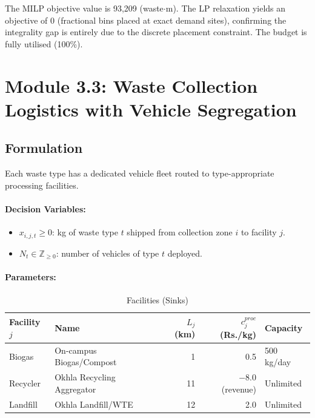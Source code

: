 \documentclass[11pt,a4paper]{article}
\begin{document}
The MILP objective value is 93,209 (waste$\cdot$m). The LP relaxation yields an objective of 0 (fractional bins placed at exact demand sites), confirming the integrality gap is entirely due to the discrete placement constraint. The budget is fully utilised (100\%).

\section{Module 3.3: Waste Collection Logistics with Vehicle Segregation}
\label{sec:mod33}

\subsection{Formulation}

Each waste type has a dedicated vehicle fleet routed to type-appropriate processing facilities.

\paragraph{Decision Variables:}
\begin{itemize}
    \item $x_{i,j,t} \ge 0$: kg of waste type $t$ shipped from collection zone $i$ to facility $j$.
    \item $N_t \in \mathbb{Z}_{\ge 0}$: number of vehicles of type $t$ deployed.
\end{itemize}

\paragraph{Parameters:}

\begin{table}[H]
\centering
\caption{Facilities (Sinks)}
\begin{tabular}{llrrl}
\toprule
\textbf{Facility $j$} & \textbf{Name} & \textbf{$L_j$ (km)} & \textbf{$c^{proc}_j$ (Rs./kg)} & \textbf{Capacity} \\ \midrule
Biogas    & On-campus Biogas/Compost     & 1   & 0.5  & 500 kg/day \\
Recycler  & Okhla Recycling Aggregator   & 11  & $-$8.0 (revenue) & Unlimited \\
Landfill  & Okhla Landfill/WTE           & 12  & 2.0  & Unlimited \\
\bottomrule
\end{tabular}
\end{table}
\end{document}
